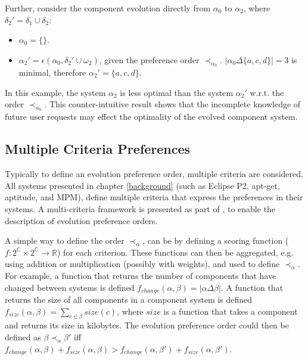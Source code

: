 Further, consider the component evolution directly from $\alpha_0$ to $\alpha_2$, where $\delta_2' = \delta_1 \cup \delta_2$:
\begin{itemize}
  \item $\alpha_0 = \{\}$.
  \item $\alpha_2' = \epsilon(\alpha_0,\delta_2' \cup \omega_2)$, given the preference order $\prec_{\alpha_0}$. $|\alpha_0 \Delta \{a,c,d\}| = 3$ is minimal, therefore $\alpha_2' = \{a,c,d\}$.
\end{itemize}

In this example, the system $\alpha_2$ is less optimal than the system $\alpha_2'$ w.r.t. the order $\prec_{\alpha_0}$.
This counter-intuitive result shows that the incomplete knowledge of future user requests may effect the optimality of the evolved component system.

\subsection{Multiple Criteria Preferences}
\label{formal.opt}
Typically to define an evolution preference order, multiple criteria are considered. 
All systems presented in chapter \ref{background} (such as Eclipse P2, apt-get, aptitude, and MPM), define multiple criteria that express the preferences in their systems.
A multi-criteria framework is presented as part of \modelname, to enable the description of evolution preference orders. 

A simple way to define the order $\prec_{\alpha}$, can be by defining a scoring function ($f: 2^{\mathbb{C}} \times 2^{\mathbb{C}} \rightarrow \mathbb{R}$) for each criterion. 
These functions can then be aggregated, e.g. using addition or multiplication (possibly with weights), and used to define $\prec_{\alpha}$.
For example, a function that returns the number of components that have changed between systems is defined $f_{change}(\alpha,\beta) = |\alpha \Delta \beta|$.
A function that returns the size of all components in a component system is defined $f_{size}(\alpha,\beta) = \sum \limits_{c \in \beta} size(c)$,
 where $size$ is a function that takes a component and returns its size in kilobytes.
The evolution preference order could then be defined as $\beta \prec_{\alpha} \beta'$ iff $f_{change}(\alpha,\beta) + f_{size}(\alpha,\beta) > f_{change}(\alpha,\beta') + f_{size}(\alpha,\beta')$.

